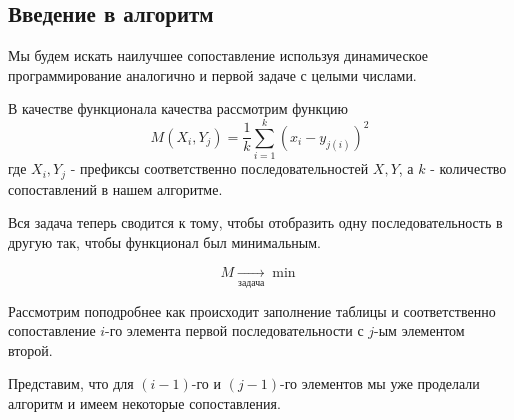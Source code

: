 \documentclass[12pt]{article}
\begin{document}
\subsection{Введение в алгоритм}

    Мы будем искать наилучшее сопоставление используя динамическое
    программирование аналогично и первой задаче с целыми числами.

    В качестве функционала качества рассмотрим функцию
    $$M(X_{i}, Y_{j}) = \frac{1}{k}\sum_{i=1}^k(x_i-y_{j(i)})^2$$
    где $X_i, Y_j$ - префиксы соответственно последовательностей $X, Y$, а
    $k$ - количество сопоставлений в нашем алгоритме.

    Вся задача теперь сводится к тому, чтобы отобразить одну
    последовательность в другую так, чтобы функционал
    был минимальным.

    $$M \xrightarrow[\text{задача}]{} \min$$

    Рассмотрим поподробнее как происходит заполнение таблицы
    и соответственно сопоставление $i$-го элемента первой последовательности с $j$-ым элементом
    второй.

    Представим, что для $(i-1)$-го и $(j-1)$-го элементов мы уже
    проделали алгоритм и имеем некоторые сопоставления.

    \begin{center}
    \end{center}
\end{document}
